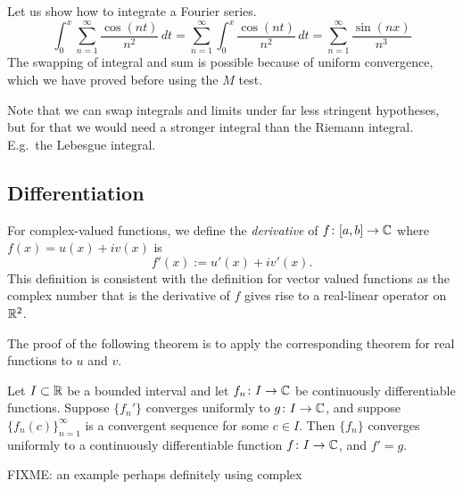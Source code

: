 \begin{example}
Let us show how to integrate a Fourier series.
\begin{equation*}
\int_{0}^x \sum_{n=1}^\infty \frac{\cos(nt)}{n^2} \,dt
=
\sum_{n=1}^\infty \int_{0}^x \frac{\cos(nt)}{n^2}\,dt
=
\sum_{n=1}^\infty \frac{\sin(nx)}{n^3}
\end{equation*}
The swapping of integral and sum is possible because of uniform convergence,
which we have proved before using the $M$ test.
\end{example}

Note that we can swap integrals and limits under far less stringent hypotheses,
but for that we would need a stronger integral than the Riemann integral.
E.g.\ the Lebesgue integral.

\subsection{Differentiation}

For complex-valued functions, we define the
\emph{derivative}
of $f \colon [a,b] \to
{\mathbb{C}}$ where $f(x) = u(x)+iv(x)$ is
\begin{equation*}
f'(x) := u'(x)+iv'(x) .
\end{equation*}
This definition is consistent with the definition for vector valued
functions as the complex number that is the derivative of $f$ gives rise to
a real-linear operator on ${\mathbb{R}}^2$.

The proof of the following theorem is to apply the corresponding theorem for
real functions to $u$ and $v$.

\begin{thm} \label{thm:dersconvergecomplex}
Let $I \subset {\mathbb{R}}$ be a bounded interval and let
$f_n \colon I \to {\mathbb{C}}$ be continuously differentiable functions.
Suppose $\{ f_n' \}$ converges uniformly to $g \colon I \to {\mathbb{C}}$,
and suppose $\{ f_n(c) \}_{n=1}^\infty$ is a
convergent sequence for some $c \in I$.  Then $\{ f_n \}$ converges uniformly to 
a continuously differentiable function $f \colon I \to {\mathbb{C}}$, and $f' = g$.
\end{thm}


FIXME: an example perhaps definitely using complex

